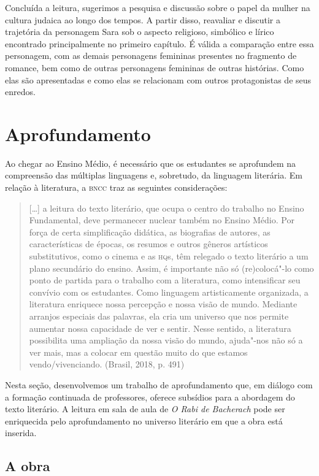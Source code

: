 \documentclass[12pt]{extarticle}
\begin{document}
Concluída a leitura, sugerimos a pesquisa e discussão sobre
o papel da mulher na cultura judaica ao longo dos tempos. A partir
disso, reavaliar e discutir a trajetória da personagem Sara sob o
aspecto religioso, simbólico e lírico encontrado principalmente no
primeiro capítulo. É válida a comparação entre essa personagem, com as
demais personagens femininas presentes no fragmento de romance, bem como
de outras personagens femininas de outras histórias. Como elas são
apresentadas e como elas se relacionam com outros protagonistas de seus
enredos.

\section{Aprofundamento}

Ao chegar ao Ensino Médio, é necessário que os estudantes se aprofundem
na compreensão das múltiplas linguagens e, sobretudo, da linguagem
literária. Em relação à literatura, a \textsc{bncc} traz as seguintes
considerações:

\begin{quote}
{[}\ldots{}{]} a leitura do texto literário, que ocupa o centro do trabalho
no Ensino Fundamental, deve permanecer nuclear também no Ensino Médio.
Por força de certa simplificação didática, as biografias de autores, as
características de épocas, os resumos e outros gêneros artísticos
substitutivos, como o cinema e as \textsc{hq}s, têm relegado o texto literário a
um plano secundário do ensino. Assim, é importante não só (re)colocá"-lo
como ponto de partida para o trabalho com a literatura, como
intensificar seu convívio com os estudantes. Como linguagem
artisticamente organizada, a literatura enriquece nossa percepção e
nossa visão de mundo. Mediante arranjos especiais das palavras, ela cria
um universo que nos permite aumentar nossa capacidade de ver e sentir.
Nesse sentido, a literatura possibilita uma ampliação da nossa visão do
mundo, ajuda"-nos não só a ver mais, mas a colocar em questão muito do
que estamos vendo/vivenciando. (Brasil, 2018, p. 491)
\end{quote}

Nesta seção, desenvolvemos um trabalho de aprofundamento que, em diálogo
com a formação continuada de professores, oferece subsídios para a
abordagem do texto literário. A leitura em sala de aula de \emph{O Rabi
de Bacherach} pode ser enriquecida pelo aprofundamento no universo
literário em que a obra está inserida.

\subsection{A obra}
\end{document}

